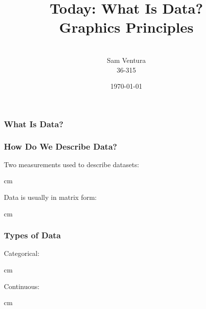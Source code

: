 \documentclass{beamer} %
\begin{document}
\title[dedup]{Today:  What Is Data?\\Graphics Principles}


\author[Samuel L. Ventura]{\\
  \large{Sam Ventura\\36-315}}
\date{\today}


\begin{frame}
	\maketitle
	
\end{frame}



\begin{frame}\frametitle{What Is Data?}
	\centering
	
\end{frame}


\begin{frame}\frametitle{How Do We Describe Data?}
	Two measurements used to describe datasets:
	
	 cm
	
	Data is usually in matrix form:
	
	 cm
	
\end{frame}


\begin{frame}\frametitle{Types of Data}
	
	Categorical:
	
	 cm
	
	Continuous:
	
	 cm
	
\end{frame}
\end{document}
